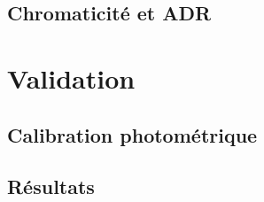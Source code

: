\documentclass[../main/main.tex]{subfiles}
\begin{document}
\subsection{Chromaticité et ADR}\label{ssec:chromadr}

\section{Validation}\label{sec:validationpsf}

\subsection{Calibration photométrique}\label{ssec:photocalibstd}

\subsection{Résultats}\label{ssec:resultscalib}




\end{document}
